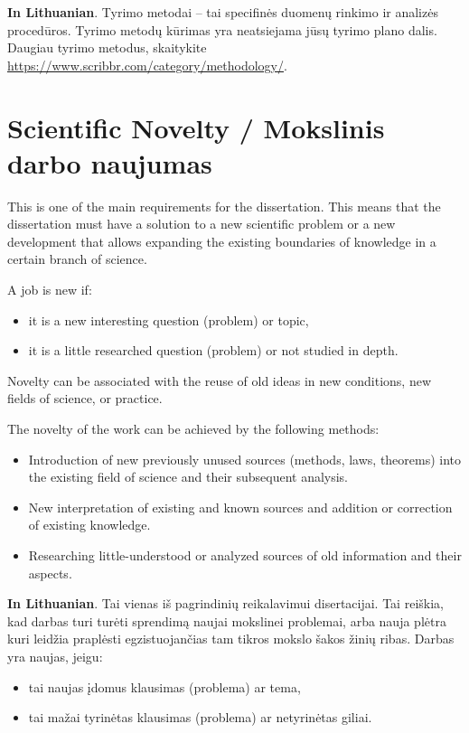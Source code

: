 \textbf{In Lithuanian}. 
Tyrimo metodai – tai specifinės duomenų rinkimo ir analizės procedūros. Tyrimo metodų kūrimas yra neatsiejama jūsų tyrimo plano dalis. Daugiau tyrimo metodus, skaitykite \url{https://www.scribbr.com/category/methodology/}.


\section*{Scientific Novelty / Mokslinis darbo naujumas} %

This is one of the main requirements for the dissertation. This means that the dissertation must have a solution to a new scientific problem or a new development that allows expanding the existing boundaries of knowledge in a certain branch of science.

A job is new if:
\begin{itemize}
 \item it is a new interesting question (problem) or topic,
 \item it is a little researched question (problem) or not studied in depth.
\end{itemize}

Novelty can be associated with the reuse of old ideas in new conditions, new fields of science, or practice.

The novelty of the work can be achieved by the following methods:
\begin{itemize}
 \item Introduction of new previously unused sources (methods, laws, theorems) into the existing field of science and their subsequent analysis.
 \item New interpretation of existing and known sources and addition or correction of existing knowledge.
 \item Researching little-understood or analyzed sources of old information and their aspects.
\end{itemize}


\textbf{In Lithuanian}. Tai vienas iš pagrindinių reikalavimui disertacijai. Tai reiškia, kad darbas turi turėti sprendimą naujai mokslinei problemai, arba nauja plėtra kuri leidžia praplėsti egzistuojančias tam tikros mokslo šakos žinių ribas.
Darbas yra naujas, jeigu:
\begin{itemize}
    \item tai naujas įdomus klausimas (problema) ar tema,
    \item tai mažai tyrinėtas klausimas (problema) ar netyrinėtas giliai.
\end{itemize}

